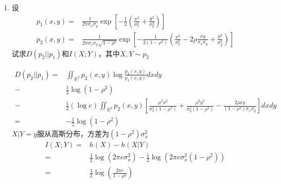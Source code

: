 \documentclass[a4paper]{article}
\begin{document}
\begin{enumerate}[label=\thehwcnt.\arabic*.]
\item 设
\begin{align*}
p_1(x,y)=& \frac{1}{2\pi \sigma_x\sigma_y}\exp[-\frac{1}{2}(\frac{x^2}{\sigma_x^2}+\frac{y^2}{\sigma_y^2})]\\
p_2(x,y)=& \frac{1}{2\pi \sigma_x\sigma_y\sqrt{1-\rho^2}}\exp[-\frac{1}{2(1-\rho^2)}(\frac{x^2}{\sigma_x^2}-2\rho\frac{xy}{\sigma_x\sigma_y}+\frac{y^2}{\sigma_y^2})]
\end{align*}
试求$D(p_2||p_1)$和$I(X;Y)$，其中$X,Y\sim p_2$
\begin{solution}
\begin{align*}
D(p_2||p_1) = & \iint_{\mathbb{R}^2} p_2(x,y)\log \frac{p_2(x,y)}{p_1(x,y)}dxdy \\
 -&\frac{1}{2}\log(1-\rho^2)\\
-&\frac{1}{2}(\log e)\iint_{\mathbb{R}^2} p_2(x,y)\left[\frac{\rho^2 x^2}{\sigma_x^2(1-\rho^2)}+\frac{\rho^2 y^2}{\sigma_y^2(1-\rho^2)}-\frac{2\rho xy}{(1-\rho^2)\sigma_x\sigma_y}\right]dxdy\\
=&-\frac{1}{2}\log(1-\rho^2)
\end{align*}
$X|Y=y$服从高斯分布，方差为$(1-\rho^2)\sigma_x^2$
\begin{align*}
I(X;Y) = & h(X)-h(X|Y)\\
= & \frac{1}{2}\log(2\pi e \sigma_x^2) - \frac{1}{2}\log(2\pi e \sigma_x^2(1-\rho^2))\\
= & \frac{1}{2}\log(\frac{2\pi e}{1-\rho^2})
\end{align*}

\end{solution}

\end{enumerate}
\end{document}
